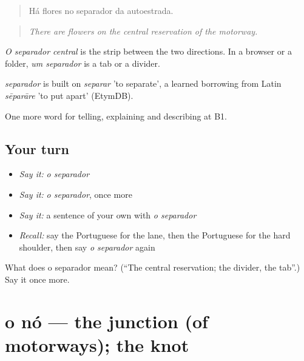 \begin{quote}
Há flores no separador da autoestrada.
\end{quote}

\begin{quote}
\emph{There are flowers on the central reservation of the motorway.}
\end{quote}

\emph{O separador central} is the strip between the two directions. In a browser or a folder, \emph{um separador} is a tab or a divider.

\begin{cousinweb}
\emph{separador} is built on \emph{separar} 'to separate', a learned borrowing from Latin \emph{sēparāre} 'to put apart' (EtymDB).
\end{cousinweb}

\begin{grammarlens}[title={What you've built}]
One more word for telling, explaining and describing at B1.
\end{grammarlens}

\subsection*{Your turn}
\begin{itemize}
\raggedright
  \item \emph{Say it:} \emph{o separador}
  \item \emph{Say it:} \emph{o separador}, once more
  \item \emph{Say it:} a sentence of your own with \emph{o separador}
  \item \emph{Recall:} say the Portuguese for the lane, then the Portuguese for the hard shoulder, then say \emph{o separador} again
\end{itemize}

\begin{tcolorbox}[breakable,colback=teal!4,colframe=teal!35!black,title={Before you move on}]
What does o separador mean? (\textquotedblleft{}The central reservation; the divider, the tab\textquotedblright{}.) Say it once more.
\end{tcolorbox}
\section[o nó]{o nó — the junction (of motorways); the knot}

\label{lesson:PT-C401-no}



